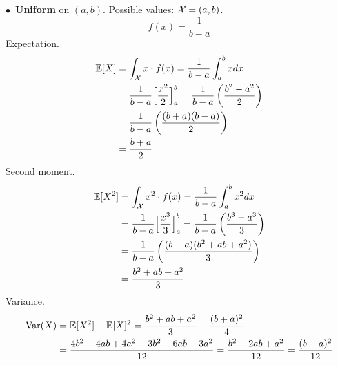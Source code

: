 \medskip\noindent$\bullet$ \textbf{Uniform} on $(a, b)$. Possible values: $\mathcal{X} = (a,b)$. 
$$
f(x) = \frac{1}{b - a}
$$
Expectation.
\begin{align*}
    \mathbb{E}[X] &= \int_{\mathcal{X}} x\cdot f(x) = \frac{1}{b-a}\int_a^b x dx \\
    &= \frac{1}{b-a}\Big[\frac{x^2}{2}\Big]_a^b = \frac{1}{b-a}\left(\frac{b^2 - a^2}{2}\right) \\
    &= \frac{1}{b-a}\left(\frac{(b+a)(b-a)}{2}\right) \\
    &= \frac{b + a}{2}
\end{align*}
Second moment.
\begin{align*}
    \mathbb{E}[X^2] &= \int_{\mathcal{X}} x^2\cdot f(x) = \frac{1}{b-a}\int_a^b x^2 dx \\
    &= \frac{1}{b-a}\Big[\frac{x^3}{3}\Big]_a^b = \frac{1}{b-a}\left(\frac{b^3 - a^3}{3}\right) \\
    &= \frac{1}{b-a}\left(\frac{(b-a)(b^2 + ab + a^2)}{3}\right) \\
    &= \frac{b^2 + ab + a^2}{3}
\end{align*}
Variance.
\begin{align*}
    \V(X) &= \E[X^2] - \E[X]^2 = \frac{b^2 + ab + a^2}{3} - \frac{(b+a)^2}{4}\\ %
    &= \frac{4b^2 + 4ab + 4a^2 - 3b^2 - 6ab - 3a^2}{12} = \frac{b^2 - 2ab + a^2}{12} = \frac{(b-a)^2}{12}
\end{align*}

